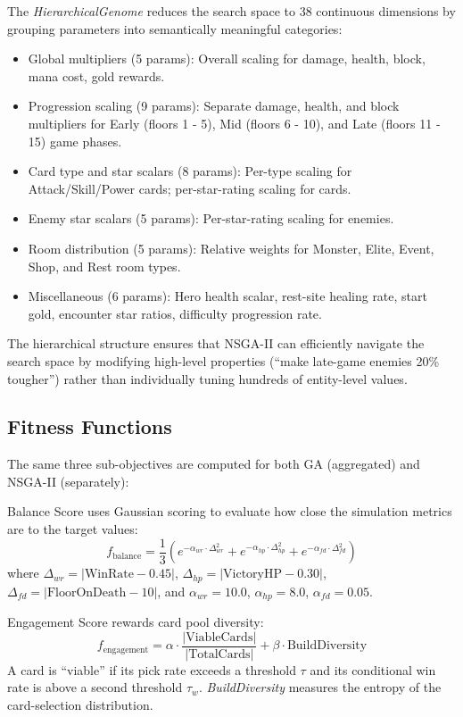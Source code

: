 The \textit{HierarchicalGenome} reduces the search space to 38 continuous dimensions by grouping parameters into semantically meaningful categories:
\begin{itemize}
    \item Global multipliers (5 params): Overall scaling for damage, health, block, mana cost, gold rewards.
    \item Progression scaling (9 params): Separate damage, health, and block multipliers for Early (floors 1 - 5), Mid (floors 6 - 10), and Late (floors 11 - 15) game phases.
    \item Card type and star scalars (8 params): Per-type scaling for Attack/Skill/Power cards; per-star-rating scaling for cards.
    \item Enemy star scalars (5 params): Per-star-rating scaling for enemies.
    \item Room distribution (5 params): Relative weights for Monster, Elite, Event, Shop, and Rest room types.
    \item Miscellaneous (6 params): Hero health scalar, rest-site healing rate, start gold, encounter star ratios, difficulty progression rate.
\end{itemize}
The hierarchical structure ensures that NSGA-II can efficiently navigate the search space by modifying high-level properties (``make late-game enemies 20\% tougher'') rather than individually tuning hundreds of entity-level values.

\subsection{Fitness Functions}

The same three sub-objectives are computed for both GA (aggregated) and NSGA-II (separately):

Balance Score uses Gaussian scoring to evaluate how close the simulation metrics are to the target values:
\begin{equation}
f_{\text{balance}} = \frac{1}{3}\left(e^{-\alpha_{wr} \cdot \Delta_{wr}^2} + e^{-\alpha_{hp} \cdot \Delta_{hp}^2} + e^{-\alpha_{fd} \cdot \Delta_{fd}^2}\right)
\label{eq:balance_score}
\end{equation}
where $\Delta_{wr} = |\text{WinRate} - 0.45|$, $\Delta_{hp} = |\text{VictoryHP} - 0.30|$, $\Delta_{fd} = |\text{FloorOnDeath} - 10|$, and $\alpha_{wr}=10.0$, $\alpha_{hp}=8.0$, $\alpha_{fd}=0.05$.

Engagement Score rewards card pool diversity:
\begin{equation}
f_{\text{engagement}} = \alpha \cdot \frac{|\text{ViableCards}|}{|\text{TotalCards}|} + \beta \cdot \text{BuildDiversity}
\label{eq:engagement_score}
\end{equation}
A card is ``viable'' if its pick rate exceeds a threshold $\tau$ and its conditional win rate is above a second threshold $\tau_w$. \textit{BuildDiversity} measures the entropy of the card-selection distribution.

